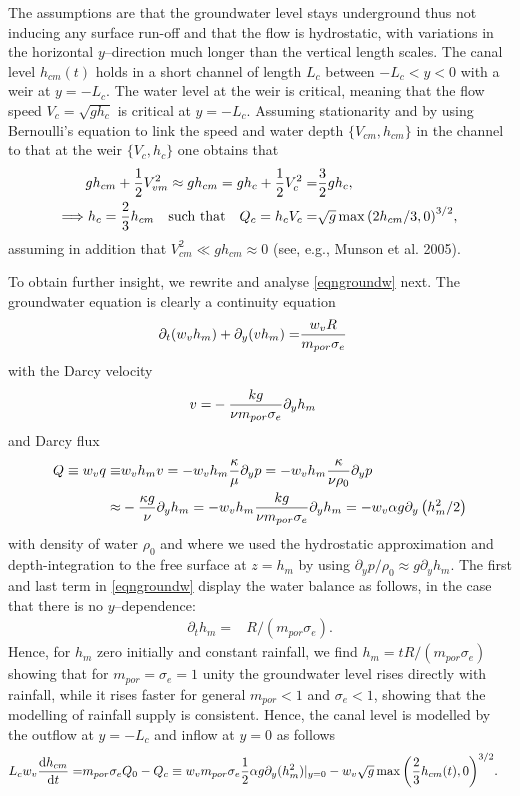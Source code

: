 \documentclass [12pt,english]{article}
\def\frac#1#2{ {#1\over#2}}
\begin{document}
The assumptions are that the groundwater level stays underground thus not inducing any surface run-off and that the
flow is hydrostatic, with variations in the horizontal $y$--direction much longer than the vertical length scales.
The canal level $h_{cm}(t)$ holds in a short channel of length $L_c$ between $-L_c<y<0$ with a weir at $y=-L_c$.
The water level at the weir is critical, meaning that the flow speed $V_{c}=\sqrt{g h_c}$ is critical at $y=-L_c$.
Assuming stationarity and by using Bernoulli's equation to link the speed and water depth $\{V_{cm},h_{cm}\}$ in the channel to that at the weir $\{V_c,h_c\}$ one obtains that
\begin{align}
g h_{cm}+\frac 12 V_{vm}^2 \approx g h_{cm} = g h_c+ \frac 12 V_c^2 =& \frac 32 g h_c,\\
\Longrightarrow h_c = \frac 23 h_{cm}\quad\textrm{such~that}\quad Q_c = h_c V_c =& \sqrt{g}\max{(2 h_{cm}/3,0)}^{3/2},
\end{align}
assuming in addition that $V_{cm}^2\ll g h_{cm}\approx 0$ (see, e.g., Munson et al. 2005). 

To obtain further insight, we rewrite and analyse \eqref{eqngroundw} next.
The groundwater equation is clearly a continuity equation
\begin{align}
\partial_t(w_v h_m) +\partial_y(v h_m) =& \frac {w_v R}{m_{por}\sigma_e}
\end{align}
with the Darcy velocity
\begin{align}
  v =& -\frac {k g}{\nu m_{por} \sigma_e}\partial_y h_m  
\end{align}
and Darcy flux
\begin{align}
  Q \equiv w_v q \equiv &  w_v h_m v = -w_v h_m \frac {\kappa}{\mu}\partial_y p = -w_v h_m \frac {\kappa}{\nu\rho_0}\partial_y p\nonumber\\
  \approx &  - \frac {\kappa g}{\nu}\partial_y h_m =-w_v h_m\frac {k g}{\nu m_{por}\sigma_e} \partial_y h_m
  = -w_v \alpha g \partial_y\left(h_m^2 /2\right) 
\end{align}
with density of water $\rho_0$ and where we used the hydrostatic approximation and depth-integration
to the free surface at $z=h_m$ by using $\partial_y p/\rho_0 \approx g\partial_y h_m$.
The first and last term in \eqref{eqngroundw} display the water balance as follows, in the case that there is no $y$--dependence:
\begin{align}
\partial_t h_m =& {R}/{(m_{por}\sigma_e)}.
\end{align}
Hence, for $h_m$ zero initially and constant rainfall, we find $h_m = t R /(m_{por}\sigma_e)$
showing that for $m_{por}=\sigma_e=1$ unity the groundwater level rises directly with rainfall,
while it rises faster for general $m_{por}<1$ and $\sigma_e<1$, showing that the modelling of rainfall supply is consistent.
Hence, the canal level is modelled by the outflow at $y=-L_c$ and inflow at $y=0$ as follows
\begin{align}
  L_c w_v \frac {{\rm d}h_{cm}}{{\rm d} t} =& m_{por}\sigma_e Q_0-Q_c \equiv w_v m_{por}\sigma_e\frac 12\alpha g \partial_y(h_m^2)|_{y=0} -w_v \sqrt{g} \max{\left(\frac 23 h_{cm}(t),0\right)}^{3/2}.\nonumber
  \end{align}
\end{document}
